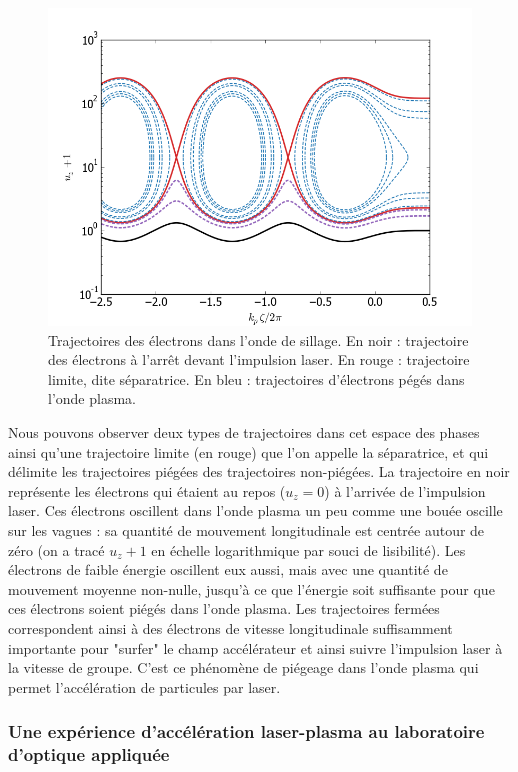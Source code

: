 \documentclass[a4paper]{book}
\begin{document}
\begin{figure}[!htbp]
\begin{center}
\includegraphics[width=12cm]{trajectories.png}
\end{center}
\caption{Trajectoires des électrons dans l'onde de sillage. En noir : trajectoire des électrons à l'arrêt devant l'impulsion laser. En rouge : trajectoire limite, dite séparatrice. En bleu : trajectoires d'électrons pégés dans l'onde plasma. }
\label{fig:trajectories}
\end{figure}

Nous pouvons observer deux types de trajectoires dans cet espace des phases ainsi qu'une trajectoire limite (en rouge) que l'on appelle la séparatrice, et qui délimite les trajectoires piégées des trajectoires non-piégées. La trajectoire en noir représente les électrons qui étaient au repos ($u_z = 0$) à l'arrivée de l'impulsion laser. Ces électrons oscillent dans l'onde plasma un peu comme une bouée oscille sur les vagues : sa quantité de mouvement longitudinale est centrée autour de zéro (on a tracé $u_z+1$ en échelle logarithmique par souci de lisibilité). Les électrons de faible énergie oscillent eux aussi, mais avec une quantité de mouvement moyenne non-nulle, jusqu'à ce que l'énergie soit suffisante pour que ces électrons soient piégés dans l'onde plasma. Les trajectoires fermées correspondent ainsi à des électrons de vitesse longitudinale suffisamment importante pour "surfer" le champ accélérateur et ainsi suivre l'impulsion laser à la vitesse de groupe. C'est ce phénomène de piégeage dans l'onde plasma qui permet l'accélération de particules par laser. 

\subsubsection{Une expérience d'accélération laser-plasma au laboratoire d'optique appliquée}


\printbibliography[title={Bibliographie}]



%
%
\end{document}
